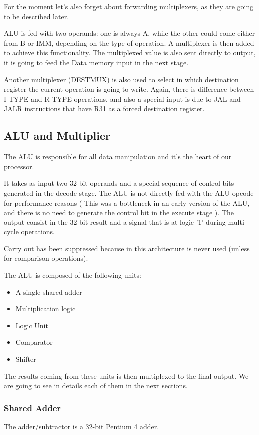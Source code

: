 \documentclass[12pt]{article}
\begin{document}
For the moment let's also forget about forwarding multiplexers, as they are going to be described later.

ALU is fed with two operands: one is always A, while the other could come either from B or IMM, depending on the type of operation. A multiplexer is then added to achieve this functionality.
The multiplexed value is also sent directly to output, it is going to feed the Data memory input in the next stage.

Another multiplexer (DESTMUX) is also used to select in which destination register the current operation is going to write. Again, there is difference between I-TYPE and R-TYPE operations, and also a special input is due to JAL and JALR instructions that have R31 as a forced destination register.

 
\subsection{ALU and Multiplier}
The ALU is responsible for all data manipulation and it's the heart of our processor.

It takes as input two 32 bit operands and a special sequence of control bits generated in the decode stage. The ALU is not directly fed with the ALU opcode for performance reasons ( This was a bottleneck in an early version of the ALU, and there is no need to generate the control bit in the execute stage ).
The output consist in the 32 bit result and a signal that is at logic '1' during multi cycle operations.

Carry out has been suppressed because in this architecture is never used (unless for comparison operations).

The ALU is composed of the following units:

\begin{itemize}
	\item A single shared adder
	\item Multiplication logic
	\item Logic Unit
	\item Comparator
	\item Shifter
\end{itemize}

The results coming from these units is then multiplexed to the final output.
We are going to see in details each of them in the next sections.

\subsubsection{Shared Adder}
The adder/subtractor is a 32-bit Pentium 4 adder.
\end{document}

